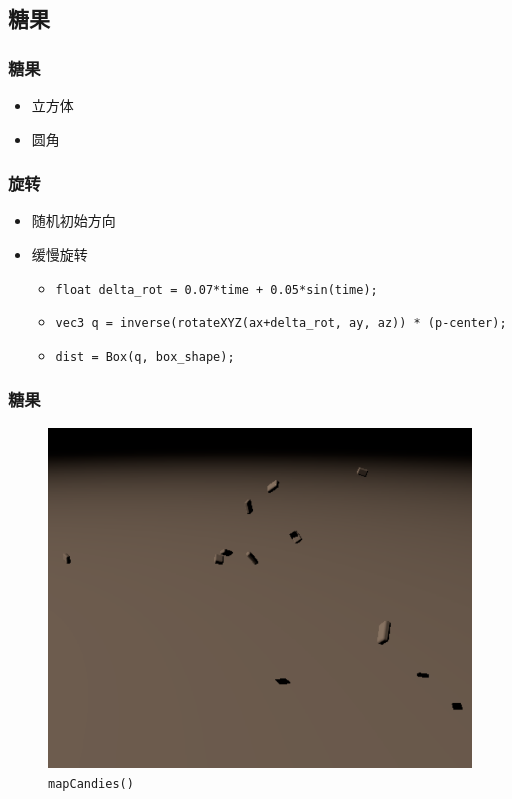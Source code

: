 \documentclass[aspectratio=169]{ctexbeamer} %
\begin{document}
\subsection{糖果}
\begin{frame}
    \frametitle{糖果}
    \begin{itemize}
        \item 立方体
        \item 圆角
    \end{itemize}
\end{frame}
\begin{frame}
    \frametitle{旋转}
    \begin{itemize}
        \item 随机初始方向
        \item 缓慢旋转
        \begin{itemize}
            \item \texttt{float delta\_rot = 0.07*time + 0.05*sin(time);}
            \item \texttt{vec3 q = inverse(rotateXYZ(ax+delta\_rot, ay, az)) * (p-center);}
            \item \texttt{dist = Box(q, box\_shape);}
        \end{itemize}
    \end{itemize}
\end{frame}
\begin{frame}
    \frametitle{糖果}
    \begin{figure}[htbp]
        \centering
        \includegraphics[height=.75\textheight]{images/pre/candies.pdf}
        \caption{\texttt{mapCandies()}}
        \label{fig:candies}
    \end{figure}
\end{frame}
\end{document}
